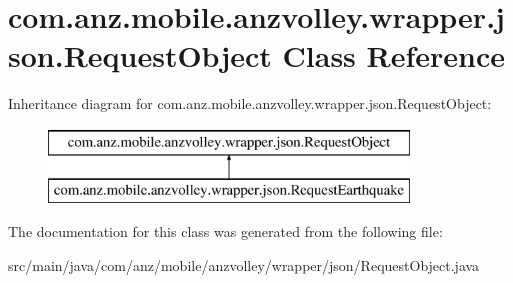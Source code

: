 \hypertarget{classcom_1_1anz_1_1mobile_1_1anzvolley_1_1wrapper_1_1json_1_1_request_object}{\section{com.\+anz.\+mobile.\+anzvolley.\+wrapper.\+json.\+Request\+Object Class Reference}
\label{classcom_1_1anz_1_1mobile_1_1anzvolley_1_1wrapper_1_1json_1_1_request_object}
}
Inheritance diagram for com.\+anz.\+mobile.\+anzvolley.\+wrapper.\+json.\+Request\+Object\+:\begin{figure}[H]
\begin{center}
\leavevmode
\includegraphics[height=2.000000cm]{classcom_1_1anz_1_1mobile_1_1anzvolley_1_1wrapper_1_1json_1_1_request_object}
\end{center}
\end{figure}


The documentation for this class was generated from the following file\+:\begin{DoxyCompactItemize}
\item 
src/main/java/com/anz/mobile/anzvolley/wrapper/json/Request\+Object.\+java\end{DoxyCompactItemize}
